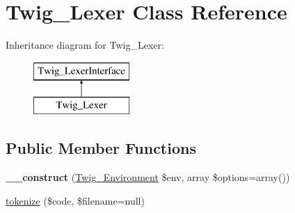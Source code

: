 \hypertarget{classTwig__Lexer}{}\section{Twig\+\_\+\+Lexer Class Reference}
\label{classTwig__Lexer}
Inheritance diagram for Twig\+\_\+\+Lexer\+:\begin{figure}[H]
\begin{center}
\leavevmode
\includegraphics[height=2.000000cm]{classTwig__Lexer}
\end{center}
\end{figure}
\subsection*{Public Member Functions}
\begin{DoxyCompactItemize}
\item 
{\bfseries \+\_\+\+\_\+construct} (\hyperlink{classTwig__Environment}{Twig\+\_\+\+Environment} \$env, array \$options=array())\hypertarget{classTwig__Lexer_ae09d3b5e91997ed682ce517339c75472}{}\label{classTwig__Lexer_ae09d3b5e91997ed682ce517339c75472}

\item 
\hyperlink{classTwig__Lexer_a073857c95bd883cb7a816e30336e4bbf}{tokenize} (\$code, \$filename=null)
\end{DoxyCompactItemize}
